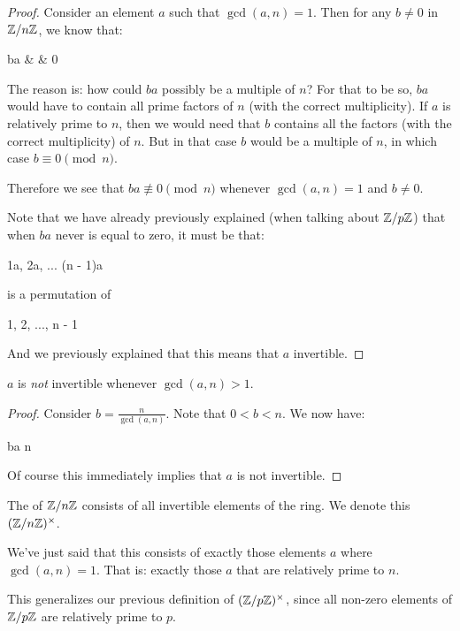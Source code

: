 \begin{proof}
  Consider an element $a$ such that $\gcd(a, n) = 1$. Then for any $b
  \ne 0$ in $\mathbb{Z} / n\mathbb{Z}$, we know that:

    \begin{nedqn}
      ba
    & \not\equiv &
      0 
    \end{nedqn}

  The reason is: how could $ba$ possibly be a multiple of $n$? For that
  to be so, $ba$ would have to contain all prime factors of $n$ (with
  the correct multiplicity). If $a$ is relatively prime to $n$, then we
  would need that $b$ contains all the factors (with the correct
  multiplicity) of $n$. But in that case $b$ would be a multiple of $n$,
  in which case $b \equiv 0 \pmod{n}$.

  Therefore we see that $ba \not\equiv 0 \pmod{n}$ whenever $\gcd(a, n)
  = 1$ and $b \ne 0$.

  Note that we have already previously explained (when talking about
  $\mathbb{Z} / p\mathbb{Z}$) that when $ba$ never is equal to zero, it must be that:

  \begin{nedqn}
    1a, 2a, ... (n - 1)a
  \end{nedqn}

  \noindent
  is a permutation of

  \begin{nedqn}
    1, 2, ..., n - 1
  \end{nedqn}

  \noindent
  And we previously explained that this means that $a$ invertible.
\end{proof}

\begin{lemma}
  $a$ is \emph{not} invertible whenever $\gcd(a, n) > 1$.
\end{lemma}

\begin{proof}
  Consider $b = \frac{n}{\gcd(a, n)}$. Note that $0 < b < n$. We now
  have:

  \begin{nedqn}
    ba
  \equivcol
    n
  \\
   
  \end{nedqn}

  Of course this immediately implies that $a$ is not invertible.
\end{proof}

\begin{definition}
  The  of $\mathbb{Z} / n\mathbb{Z}$ consists of all
  invertible elements of the ring. We denote this $\mathopen{}\left( {\mathbb{Z} / n\mathbb{Z}} \right)\mathclose{}^\times$.

  We've just said that this consists of exactly those elements $a$ where
  $\gcd(a, n) = 1$. That is: exactly those $a$ that are relatively prime
  to $n$.

  This generalizes our previous definition of $\mathopen{}\left( {\mathbb{Z} / p\mathbb{Z}} \right)\mathclose{}^\times$, since all
  non-zero elements of $\mathbb{Z} / p\mathbb{Z}$ are relatively prime to $p$.
\end{definition}
